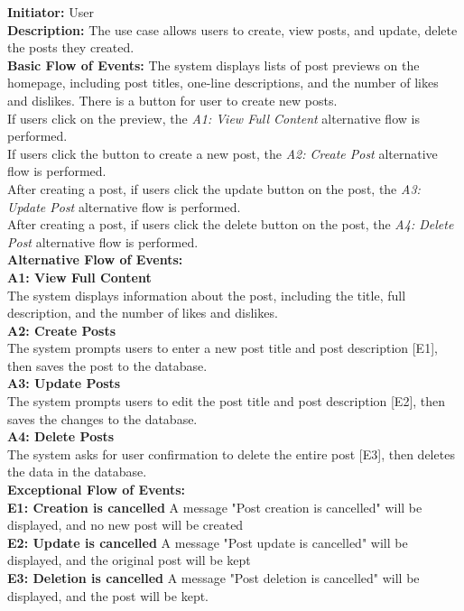 \documentclass[11pt, a4paper]{article}
\begin{document}
\textbf{Initiator: }User\\
\textbf{Description: }The use case allows users to create, view posts, and update, delete the posts they created.\\
\textbf{Basic Flow of Events: }The system displays lists of post previews on the homepage, including post titles, one-line descriptions, and the number of likes and dislikes. There is a button for user to create new posts.\\
If users click on the preview, the \textit{A1: View Full Content} alternative flow is performed.\\
If users click the button to create a new post, the \textit{A2: Create Post} alternative flow is performed.\\
After creating a post, if users click the update button on the post, the \textit{A3: Update Post} alternative flow is performed.\\
After creating a post, if users click the delete button on the post, the \textit{A4: Delete Post} alternative flow is performed.\\
\textbf{Alternative Flow of Events: }\\
\textbf{A1: View Full Content}\\
The system displays information about the post, including the title, full description, and the number of likes and dislikes.\\
\textbf{A2: Create Posts}\\
The system prompts users to enter a new post title and post description [E1], then saves the post to the database.\\
\textbf{A3: Update Posts}\\
The system prompts users to edit the post title and post description [E2], then saves the changes to the database.\\
\textbf{A4: Delete Posts}\\
The system asks for user confirmation to delete the entire post [E3], then deletes the data in the database.\\
\textbf{ Exceptional Flow of Events:}\\
\textbf{E1: Creation is cancelled } A message "Post creation is cancelled" will be displayed, and no new post will be created\\
\textbf{E2: Update is cancelled } A message "Post update is cancelled" will be displayed, and the original post will be kept\\
\textbf{E3: Deletion is cancelled } A message "Post deletion is cancelled" will be displayed, and the post will be kept.\\
\end{document}

